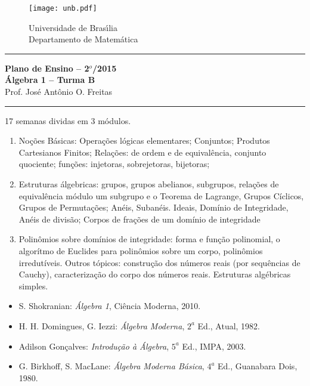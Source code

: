 \documentclass[12pt]{article}
\begin{document}
\pagestyle{empty}

\begin{figure}[h]
    \begin{minipage}[c]{1.7cm}
    \texttt{[image: unb.pdf]}
    \end{minipage}%
    \hspace{0pt}
    \begin{minipage}[c]{4in}
    {Universidade de Bras{\'\i}lia} \\
    {Departamento de Matem{\'a}tica}
    \end{minipage}
\end{figure}
\vspace{-0.9cm}
\hrule

\begin{center}
{\large\bf Plano de Ensino -- 2$^{o}$/2015} \\
{\large\bf Álgebra 1 -- Turma B}\\
Prof. Jos{\'e} Ant{\^o}nio O. Freitas
\end{center}
\hrule
\vspace{0.25cm}
 17 semanas dividas em 3 m\'{o}dulos.
\begin{enumerate}[1)]

\item Noções Básicas: Operações lógicas elementares; Conjuntos; Produtos Cartesianos Finitos; Relações: de ordem e de equivalência, conjunto quociente; funções: injetoras, sobrejetoras, bijetoras; 

\item Estruturas álgebricas: grupos, grupos abelianos, subgrupos, relações de equivalência módulo um subgrupo e o Teorema de Lagrange, Grupos Cíclicos, Grupos de Permutações; Anéis, Subanéis. Ideais, Domínio de Integridade, Anéis de divisão; Corpos de frações de um domínio de integridade

\item Polinômios sobre domínios de integridade: forma e função polinomial, o algorítmo de Euclides para polinômios sobre um corpo, polinômios irredutíveis. Outros tópicos: construção dos números reais (por sequências de Cauchy), caracterização do corpo dos números reais. Estruturas algébricas simples.
\end{enumerate}

\begin{itemize}

\item S. Shokranian: {\it {\'A}lgebra 1}, Ci{\^e}ncia Moderna, 2010.

\item H. H. Domingues, G. Iezzi: {\it {\'A}lgebra Moderna}, $2^a$
  Ed., Atual, 1982.

\item Adilson Gon{\c c}alves: {\it Introdu{\c c}{\~a}o {\`a} {\'A}lgebra}, $5^a$ Ed., IMPA,
  2003.

\item G. Birkhoff, S. MacLane: {\it {\'A}lgebra Moderna B{\'a}sica}, $4^a$ Ed.,
  Guanabara Dois, 1980.

\end{itemize}
\end{document}
